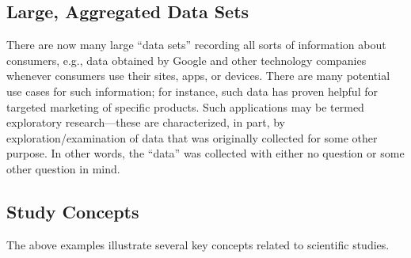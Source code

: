 \documentclass[
]{book}
\theoremstyle{definition}
\theoremstyle{definition}
\theoremstyle{definition}
\theoremstyle{definition}
\theoremstyle{remark}
\begin{document}
\hypertarget{large-aggregated-data-sets}{%
\subsection{Large, Aggregated Data Sets}\label{large-aggregated-data-sets}}

There are now many large ``data sets'' recording all sorts of information about consumers, e.g., data obtained by Google and other technology companies whenever consumers use their sites, apps, or devices. There are many potential use cases for such information; for instance, such data has proven helpful for targeted marketing of specific products. Such applications may be termed exploratory research---these are characterized, in part, by exploration/examination of data that was originally collected for some other purpose. In other words, the ``data'' was collected with either no question or some other question in mind.

\hypertarget{study-concepts}{%
\subsection{Study Concepts}\label{study-concepts}}

The above examples illustrate several key concepts related to scientific studies.
\end{document}

